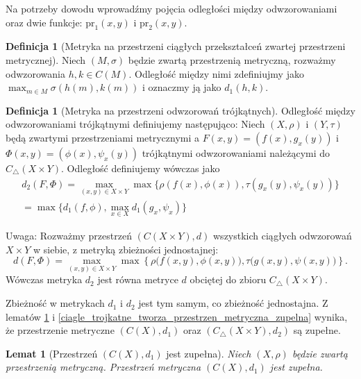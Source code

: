 \documentclass[licencjacka]{pwr_wmat_praca_dyplomowa}
\theoremstyle{plain}
\numberwithin{theorem}{chapter}
\newtheorem{lemma}[theorem]{Lemat}
\theoremstyle{definition}
\numberwithin{theorem}{chapter}
\newtheorem{definition}[theorem]{Definicja}
\begin{document}
Na potrzeby dowodu wprowadźmy pojęcia odległości między odwzorowaniami oraz dwie funkcje: $\textrm{pr}_1(x, y)$ i $\textrm{pr}_2(x, y)$. 

\begin{definition}[Metryka na przestrzeni ciągłych przekształceń zwartej przestrzeni metrycznej]
Niech $(M, \sigma)$ będzie zwartą przestrzenią metryczną, rozważmy odwzorowania $h,k \in C(M)$. Odległość między nimi zdefiniujmy jako $\max_{m \in M} \sigma(h(m), k(m))$ i oznaczmy ją jako $d_1(h,k)$.
\end{definition}


\begin{definition}[Metryka na przestrzeni odwzorowań trójkątnych]
Odległość między odwzorowaniami trójkątnymi definiujemy następująco: Niech $(X, \rho)$ i $(Y, \tau)$ będą zwartymi przestrzeniami metrycznymi a $F(x,y) = (f(x), g_x(y))$ i $\Phi(x,y) = (\phi(x), \psi_x(y))$ trójkątnymi odwzorowaniami należącymi do $C_\triangle(X \times Y)$. Odległość definiujemy wówczas jako 
\begin{align*}
d_2(F, \Phi) = \max_{(x,y) \in X \times Y} \max\{\rho(f(x),\phi(x)), \tau(g_x(y), \psi_x(y))\} \\ 
= \max\{d_1(f,\phi), \max_{x \in X}d_1(g_x, \psi_x)\}
\end{align*}
\end{definition}

Uwaga: Rozważmy przestrzeń $(C(X \times Y), d)$ wszystkich ciągłych odwzorowań $X \times Y$ w siebie, z metryką zbieżności jednostajnej: 
$$d(F, \Phi) = \max_{(x,y) \in X \times Y} \max \left\{ \rho\big(f(x,y), \phi(x,y)\big), \tau\big(g(x,y), \psi(x,y)\big) \right\}.$$ 
Wówczas metryka $d_2$ jest równa metryce $d$ obciętej do zbioru $C_\triangle(X \times Y).$

Zbieżność w metrykach $d_1$ i $d_2$ jest tym samym, co zbieżność jednostajna.
Z lematów \ref{przestrzen_ciaglych_jest_zupelna} i \ref{ciagle_trojkatne_tworza_przestrzen_metryczna_zupelna} wynika, że przestrzenie metryczne $(C(X), d_1)$ oraz $(C_\triangle(X \times Y), d_2)$ są zupełne.


\begin{lemma}[Przestrzeń $(C(X), d_1)$ jest zupełna]\label{przestrzen_ciaglych_jest_zupelna}
Niech $(X, \rho)$ będzie zwartą przestrzenią metryczną. Przestrzeń metryczna $(C(X), d_1)$ jest zupełna.
\end{lemma}
\end{document}
